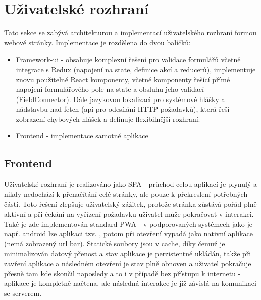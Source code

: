 
\section{Uživatelské rozhraní}
Tato sekce se zabývá architekturou a implementací uživatelského rozhraní formou webové stránky. Implementace je rozdělena do dvou balíčků:
\begin{itemize}
    \item Framework-ui - obsahuje komplexní řešení pro validace formulářů včetně integrace s Redux (napojení na state, definice akcí a reducerů), implementuje znovu použitelné React komponenty, včetně komponenty řešící přímé napojení formulářového pole na state a obsluhu jeho validací (FieldConnector). Dále jazykovou lokalizaci pro systémové hlášky a nádstavbu nad fetch (api pro odesílání HTTP požadavků), která řeší zobrazení chybových hlášek a definuje flexibilnější rozhraní.
    \item Frontend - implementace samotné aplikace
\end{itemize}

\subsection{Frontend}
Uživatelské rozhraní je realizováno jako SPA - průchod celou aplikací je plynulý a nikdy nedochází k přenačítání celé stránky, ale pouze k překreslení potřebných částí. Toto řešení zlepšuje uživatelský zážitek, protože stránka zůstává pořád plně aktivní a při čekání na vyřízení požadavku uživatel může pokračovat v interakci. Také je zde implementován standard PWA - v podporovaných systémech jako je např. android lze aplikaci tzv. , potom při otevření vypadá jako nativní aplikace (nemá zobrazený url bar). Statické soubory jsou v cache, díky čemuž je minimalizován datový přenost a stav aplikace je perzistentně ukládán, takže při zavření aplikace a následném otevření je stav plně obnoven a uživatel pokračuje přesně tam kde skončil naposledy a to i v případě bez přístupu k internetu - aplikace je kompletně načtena, ale následná interakce je již závislá na komunikaci se serverem.

